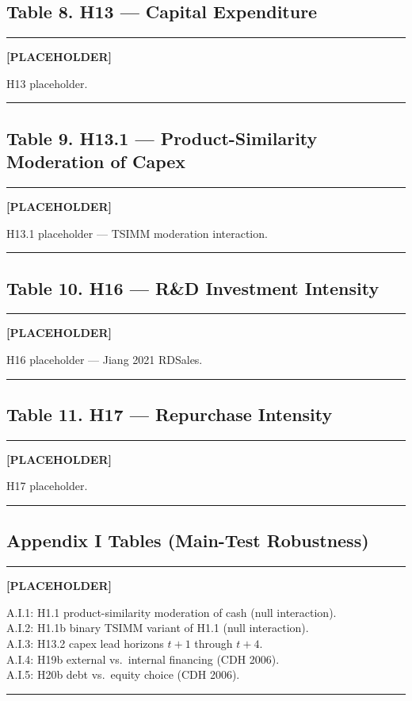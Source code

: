 \documentclass[11pt,a4paper,twocolumn]{article}
\newenvironment{placeholder}{%
  \par\medskip\noindent%
  {\color{placeholderaccent}\rule{\linewidth}{0.4pt}}\par%
  \noindent\textbf{\color{placeholderaccent}[PLACEHOLDER]}\par%
  \smallskip\itshape%
}{%
  \par\upshape\smallskip%
  {\color{placeholderaccent}\rule{\linewidth}{0.4pt}}\par\medskip%
}
\begin{document}
\subsection*{Table 8. H13 --- Capital Expenditure}
% 
\begin{placeholder}
H13 placeholder.
\end{placeholder}

\subsection*{Table 9. H13.1 --- Product-Similarity Moderation of Capex}
% 
\begin{placeholder}
H13.1 placeholder --- TSIMM moderation interaction.
\end{placeholder}

\subsection*{Table 10. H16 --- R\&D Investment Intensity}
% 
\begin{placeholder}
H16 placeholder --- Jiang 2021 RDSales.
\end{placeholder}

\subsection*{Table 11. H17 --- Repurchase Intensity}
% 
\begin{placeholder}
H17 placeholder.
\end{placeholder}

\subsection*{Appendix I Tables (Main-Test Robustness)}
\begin{placeholder}
A.I.1: H1.1 product-similarity moderation of cash (null interaction).\\
A.I.2: H1.1b binary TSIMM variant of H1.1 (null interaction).\\
A.I.3: H13.2 capex lead horizons $t+1$ through $t+4$.\\
A.I.4: H19b external vs.\ internal financing (CDH 2006).\\
A.I.5: H20b debt vs.\ equity choice (CDH 2006).
\end{placeholder}
\end{document}
